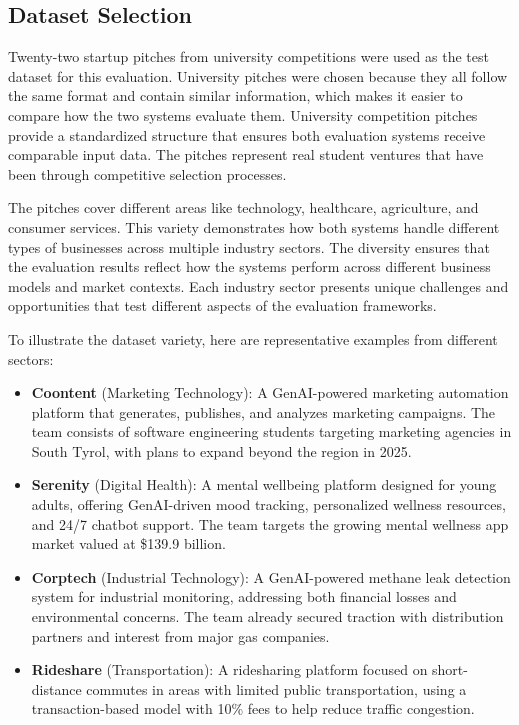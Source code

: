 \subsection{Dataset Selection}
\label{subsec:dataset}

Twenty-two startup pitches from university competitions were used as the test dataset for this evaluation. University pitches were chosen because they all follow the same format and contain similar information, which makes it easier to compare how the two systems evaluate them. University competition pitches provide a standardized structure that ensures both evaluation systems receive comparable input data. The pitches represent real student ventures that have been through competitive selection processes.

The pitches cover different areas like technology, healthcare, agriculture, and consumer services. This variety demonstrates how both systems handle different types of businesses across multiple industry sectors. The diversity ensures that the evaluation results reflect how the systems perform across different business models and market contexts. Each industry sector presents unique challenges and opportunities that test different aspects of the evaluation frameworks.

To illustrate the dataset variety, here are representative examples from different sectors:

\begin{itemize}
    \item \textbf{Coontent} (Marketing Technology): A GenAI-powered marketing automation platform that generates, publishes, and analyzes marketing campaigns. The team consists of software engineering students targeting marketing agencies in South Tyrol, with plans to expand beyond the region in 2025.

    \item \textbf{Serenity} (Digital Health): A mental wellbeing platform designed for young adults, offering GenAI-driven mood tracking, personalized wellness resources, and 24/7 chatbot support. The team targets the growing mental wellness app market valued at \$139.9 billion.

    \item \textbf{Corptech} (Industrial Technology): A GenAI-powered methane leak detection system for industrial monitoring, addressing both financial losses and environmental concerns. The team already secured traction with distribution partners and interest from major gas companies.

    \item \textbf{Rideshare} (Transportation): A ridesharing platform focused on short-distance commutes in areas with limited public transportation, using a transaction-based model with 10\% fees to help reduce traffic congestion.
\end{itemize}



